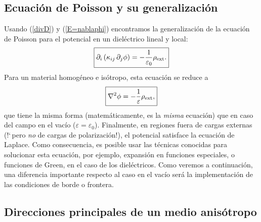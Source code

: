 \subsection{Ecuación de Poisson y su generalización}

Usando (\ref{divD}) y (\ref{E=nablaphi}) encontramos la generalización de la
ecuación de Poisson para el potencial en un dieléctrico lineal y local:
\begin{equation}
 \boxed{\partial_i\left(\kappa_{ij}\,\partial_j \phi\right)
=-\frac{1}{\varepsilon_0}\rho_{\rm ext}.}
\end{equation}
Para un material homogéneo e isótropo, esta ecuación se reduce a
\begin{equation}\label{Poissond}
 \boxed{\nabla^2\phi=-\frac{1}{\varepsilon}\rho_{\rm ext},}
\end{equation}
que tiene la misma forma (matemáticamente, es la \textit{misma} ecuación) que
en caso del campo en el vacío ($\varepsilon=\varepsilon_0$). Finalmente, en
regiones fuera de cargas externas (!`\,pero \textit{no} de cargas de
polarización!), el potencial satisface la ecuación de Laplace. Como
consecuencia, es posible usar las técnicas conocidas para solucionar esta ecuación, por ejemplo, expansión en funciones especiales, o funciones de Green, en el caso de los dieléctricos.
Como veremos a continuación, una diferencia importante respecto al caso en el
vacío será la implementación de las condiciones de borde o frontera.


\subsection{Direcciones principales de un medio anisótropo}\label{secDP}

